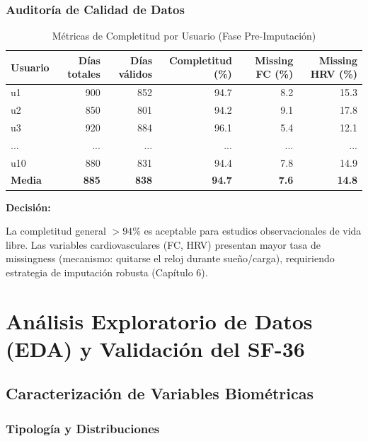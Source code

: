 \documentclass[12pt,letterpaper,twoside]{report}
\begin{document}
\subsection{Auditoría de Calidad de Datos}

\begin{table}[H]
\centering
\caption{Métricas de Completitud por Usuario (Fase Pre-Imputación)}
\label{tab:data_quality_raw}
\begin{tabular}{@{}lrrrrr@{}}
\toprule
\textbf{Usuario} & \textbf{Días totales} & \textbf{Días válidos} & \textbf{Completitud (\%)} & \textbf{Missing FC (\%)} & \textbf{Missing HRV (\%)} \\
\midrule
u1  & 900 & 852 & 94.7 & 8.2 & 15.3 \\
u2  & 850 & 801 & 94.2 & 9.1 & 17.8 \\
u3  & 920 & 884 & 96.1 & 5.4 & 12.1 \\
... & ... & ... & ... & ... & ... \\
u10 & 880 & 831 & 94.4 & 7.8 & 14.9 \\
\midrule
\textbf{Media} & \textbf{885} & \textbf{838} & \textbf{94.7} & \textbf{7.6} & \textbf{14.8} \\
\bottomrule
\end{tabular}
\end{table}

\begin{decisionbox}
\textbf{Decisión:}

La completitud general $>94\%$ es aceptable para estudios observacionales de vida libre. Las variables cardiovasculares (FC, HRV) presentan mayor tasa de missingness (mecanismo: quitarse el reloj durante sueño/carga), requiriendo estrategia de imputación robusta (Capítulo 6).
\end{decisionbox}

\chapter{Análisis Exploratorio de Datos (EDA) y Validación del SF-36}

\section{Caracterización de Variables Biométricas}

\subsection{Tipología y Distribuciones}
\end{document}
